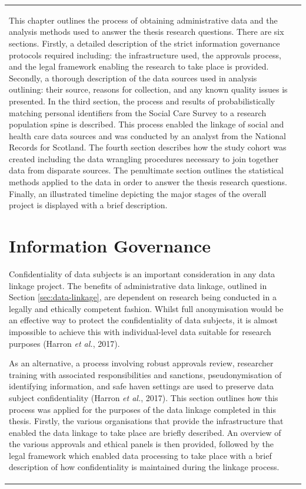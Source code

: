 \documentclass[12pt,a4paper,oneside,table]{report}
\begin{document}
\begin{tabular}[t]{ll}
This chapter outlines the process of obtaining administrative data and
the analysis methods used to answer the thesis research questions. There
are six sections. Firstly, a detailed description of the strict
information governance protocols required including: the infrastructure
used, the approvals process, and the legal framework enabling the
research to take place is provided. Secondly, a thorough description of
the data sources used in analysis outlining: their source, reasons for
collection, and any known quality issues is presented. In the third
section, the process and results of probabilistically matching personal
identifiers from the Social Care Survey to a research population spine
is described. This process enabled the linkage of social and health care
data sources and was conducted by an analyst from the National Records
for Scotland. The fourth section describes how the study cohort was
created including the data wrangling procedures necessary to join
together data from disparate sources. The penultimate section outlines
the statistical methods applied to the data in order to answer the
thesis research questions. Finally, an illustrated timeline depicting
the major stages of the overall project is displayed with a brief
description.

\section{Information Governance}\label{sec:ig}

Confidentiality of data subjects is an important consideration in any
data linkage project. The benefits of administrative data linkage,
outlined in Section \ref{sec:data-linkage}, are dependent on research
being conducted in a legally and ethically competent fashion. Whilst
full anonymisation would be an effective way to protect the
confidentiality of data subjects, it is almost impossible to achieve
this with individual-level data suitable for research purposes (Harron
\emph{et al.}, 2017).

As an alternative, a process involving robust approvals review,
researcher training with associated responsibilities and sanctions,
pseudonymisation of identifying information, and safe haven settings are
used to preserve data subject confidentiality (Harron \emph{et al.},
2017). This section outlines how this process was applied for the
purposes of the data linkage completed in this thesis. Firstly, the
various organisations that provide the infrastructure that enabled the
data linkage to take place are briefly described. An overview of the
various approvals and ethical panels is then provided, followed by the
legal framework which enabled data processing to take place with a brief
description of how confidentiality is maintained during the linkage
process.


\end{tabular}
\end{document}
